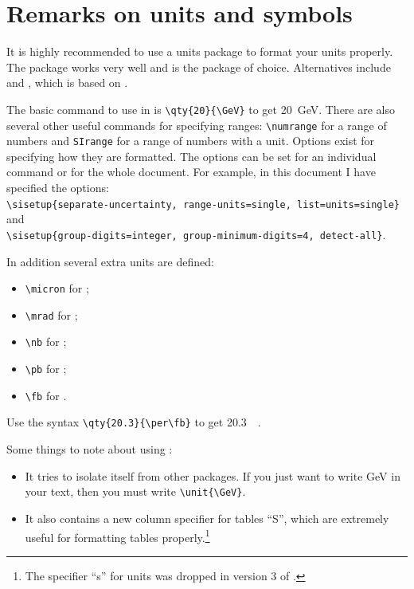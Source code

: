 \section{Remarks on units and symbols}%
\label{sec:siunitx}

It is highly recommended to use a units package to format your units properly.
The package  works very well and is the package of choice.
Alternatives include  and ,
which is based on .

The basic command to use in  is \verb|\qty{20}{\GeV}| to get
\qty{20}{\GeV}. 
There are also several other useful commands for specifying ranges:
\verb|\numrange| for a range of numbers and \verb|SIrange| for a range of numbers with a unit. 
Options exist for specifying how they are formatted.
The options can be set for an individual command or for the whole document.
For example, in this document I have specified the options:\\
\verb|\sisetup{separate-uncertainty, range-units=single, list=units=single}|
and\\
\verb|\sisetup{group-digits=integer, group-minimum-digits=4, detect-all}|.

In addition several extra units are defined:
\begin{itemize}
\item \verb|\micron| for \unit{\micron};
\item \verb|\mrad| for \unit{\mrad};
\item \verb|\nb| for \unit{\nb};
\item \verb|\pb| for \unit{\pb};
\item \verb|\fb| for \unit{\fb}.
\end{itemize}
Use the syntax \verb|\qty{20.3}{\per\fb}| to get \qty{20.3}{\per\fb}.

Some things to note about using :
\begin{itemize}
\item It tries to isolate itself from other packages.
  If you just want to write \unit{\GeV} in your text,
  then you must write \verb|\unit{\GeV}|.
\item It also contains a new column specifier for tables \enquote{S},
  which are extremely useful for formatting tables properly.\footnote{%
  The specifier \enquote{s} for units was dropped in version 3 of .}
\end{itemize}

